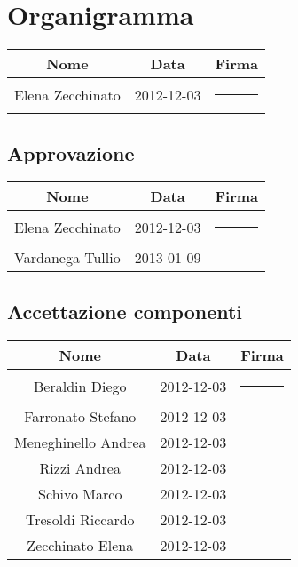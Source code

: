 \setcounter{page}{1}
\pagestyle{normal}

\section{Organigramma}
\begin{center}
\begin{tabularx}{0.8\textwidth}{c|c|c}
{\bf Nome}&{\bf Data}&{\bf Firma}\\ 
\hline
Elena Zecchinato & 2012-12-03 &\rule{3cm}{0cm} \\
\end{tabularx}
\end{center}

\subsection{Approvazione}
\begin{center}
\begin{tabularx}{0.8\textwidth}{c|c|c}
{\bf Nome}&{\bf Data}&{\bf Firma}\\ 
\hline
Elena Zecchinato & 2012-12-03 &\rule{3cm}{0cm} \\
Vardanega Tullio & 2013-01-09 & \\
\end{tabularx}
\end{center}

\subsection{Accettazione componenti}
\begin{center}
\begin{tabularx}{0.9\textwidth}{c|c|c}
{\bf Nome}&{\bf Data}&{\bf Firma }\\ 
\hline
Beraldin Diego & 2012-12-03&\rule{3cm}{0cm}\\
Farronato Stefano & 2012-12-03&\\
Meneghinello Andrea & 2012-12-03&\\
Rizzi Andrea & 2012-12-03&\\
Schivo Marco & 2012-12-03&\\
Tresoldi Riccardo & 2012-12-03&\\
Zecchinato Elena & 2012-12-03&\\
\end{tabularx}
\end{center}


